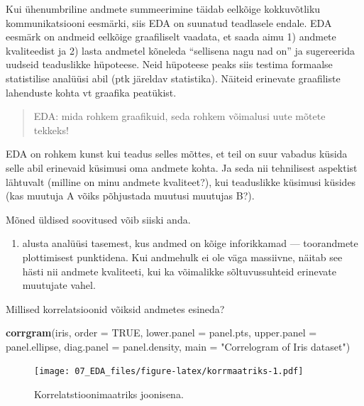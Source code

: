 \documentclass[]{book}
\newenvironment{Shaded}{\begin{snugshade}}{\end{snugshade}}
\newcommand{\KeywordTok}[1]{\textcolor[rgb]{0.13,0.29,0.53}{\textbf{#1}}}
\newcommand{\DataTypeTok}[1]{\textcolor[rgb]{0.13,0.29,0.53}{#1}}
\newcommand{\StringTok}[1]{\textcolor[rgb]{0.31,0.60,0.02}{#1}}
\newcommand{\OtherTok}[1]{\textcolor[rgb]{0.56,0.35,0.01}{#1}}
\newcommand{\NormalTok}[1]{#1}
\providecommand{\tightlist}{%
  \setlength{\itemsep}{0pt}\setlength{\parskip}{0pt}}
\begin{document}
Kui ühenumbriline andmete summeerimine täidab eelkõige kokkuvõtliku
kommunikatsiooni eesmärki, siis EDA on suunatud teadlasele endale. EDA
eesmärk on andmeid eelkõige graafiliselt vaadata, et saada aimu 1)
andmete kvaliteedist ja 2) lasta andmetel kõneleda ``sellisena nagu nad
on'' ja sugereerida uudseid teaduslikke hüpoteese. Neid hüpoteese peaks
siis testima formaalse statistilise analüüsi abil (ptk järeldav
statistika). Näiteid erinevate graafiliste lahenduste kohta vt graafika
peatükist.

\begin{quote}
EDA: mida rohkem graafikuid, seda rohkem võimalusi uute mõtete tekkeks!
\end{quote}

EDA on rohkem kunst kui teadus selles mõttes, et teil on suur vabadus
küsida selle abil erinevaid küsimusi oma andmete kohta. Ja seda nii
tehnilisest aspektist lähtuvalt (milline on minu andmete kvaliteet?),
kui teaduslikke küsimusi küsides (kas muutuja A võiks põhjustada muutusi
muutujas B?).

Mõned üldised soovitused võib siiski anda.

\begin{enumerate}
\def\labelenumi{\arabic{enumi}.}
\tightlist
\item
  alusta analüüsi tasemest, kus andmed on kõige inforikkamad ---
  toorandmete plottimisest punktidena. Kui andmehulk ei ole väga
  massiivne, näitab see hästi nii andmete kvaliteeti, kui ka võimalikke
  sõltuvussuhteid erinevate muutujate vahel.
\end{enumerate}

Millised korrelatsioonid võiksid andmetes esineda?



\begin{Shaded}
\begin{Highlighting}[]
\KeywordTok{corrgram}\NormalTok{(iris, }
         \DataTypeTok{order =} \OtherTok{TRUE}\NormalTok{, }
         \DataTypeTok{lower.panel =}\NormalTok{ panel.pts,}
         \DataTypeTok{upper.panel =}\NormalTok{ panel.ellipse,}
         \DataTypeTok{diag.panel =}\NormalTok{ panel.density,}
         \DataTypeTok{main =} \StringTok{"Correlogram of Iris dataset"}\NormalTok{)}
\end{Highlighting}
\end{Shaded}

\begin{figure}
\centering
\texttt{[image: 07\_EDA\_files/figure-latex/korrmaatriks-1.pdf]}
\caption{\label{fig:korrmaatriks}Korrelatstioonimaatriks joonisena.}
\end{figure}
\end{document}
